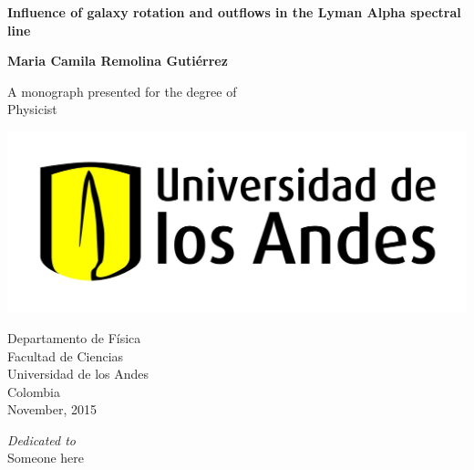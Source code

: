 

\setcounter{page}{1}

\newpage

\thispagestyle{empty}
\begin{center}
  \vspace*{1cm}
  {\Huge \bf Influence of galaxy rotation and outflows in the Lyman Alpha spectral line}

  \vspace*{2cm}
  {\LARGE\bf Maria Camila Remolina Guti\'errez}

  \vfill

  {\Large A monograph presented for the degree of\\
         [1mm] Physicist}
  \vspace*{0.9cm}
  
   \begin{center}
   \includegraphics[scale=0.12]{figures/uniandes.jpg}
   \end{center}

  {\large Departamento de F\'isica\\
		  [-3mm] Facultad de Ciencias\\
          [-3mm] Universidad de los Andes\\
          [-3mm] Colombia\\
          [1mm]  November, 2015}

\end{center}

\newpage
\thispagestyle{empty}
\begin{center}
\vspace*{2cm}
\textit{\LARGE {Dedicated to}}\\ 
Someone here

\end{center}

